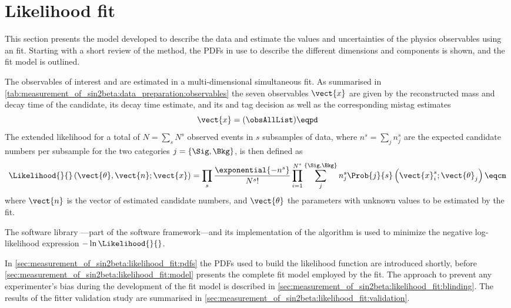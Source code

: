 
\section{Likelihood fit}
\label{sec:measurement_of_sin2beta:likelihood_fit}

This section presents the model developed to describe the data and estimate the
values and uncertainties of the physics observables using an \uEML fit. Starting
with a short review of the \uEML method, the \acp{PDF} in use to describe the
different dimensions and components is shown, and the fit model is outlined.

The \CP observables of interest \SJpsiKS and \CJpsiKS are estimated in a
multi-dimensional simultaneous \uEML fit. As summarised in
\cref{tab:measurement_of_sin2beta:data_preparation:observables} the seven
observables $\vect{x}$ are given by the reconstructed mass and decay time of the
\Bd candidate, its decay time estimate, and its \OS and \SSpi tag decision as
well as the corresponding mistag estimates
%
\begin{equation}\label{eq:measurement_of_sin2beta:likelihood_fit:observables}
  \vect{x} = (\obsAllList)\eqpd  
\end{equation}
%
The extended likelihood for a total of $N = \sum_s N^s$ observed events in $s$
subsamples of data, where $n^s = \sum_j n_j^s$ are the expected candidate
numbers per subsample for the two categories $j = \{\Sig,\Bkg\}$, is then
defined as
%
\begin{equation}\label{eq:measurement_of_sin2beta:likelihood_fit:uEML}
  \Likelihood{}{}\left(\vect{\theta},\vect{n};\vect{x}\right) = \prod_{s}^{}\frac{\exponential{-n^s}}{N^s!} \prod_{i=1}^{N^s} \sum_{j}^{\{\Sig,\Bkg\}} n_{j}^{s} \Prob{j}{s} \left( \vect{x}_{i}^{s} ; \vect{\theta}_j \right )\eqcm
\end{equation}
%
where $\vect{n}$ is the vector of estimated candidate numbers, and
$\vect{\theta}$ the parameters with unknown values to be estimated by the \uEML
fit.

The software library \RooFit \cite{Verkerke:2003ir}---part of the \ROOT
\cite{Antcheva:2011zz} software framework---and its implementation of the
\Minuit algorithm is used to minimize the negative log-likelihood expression
$-\ln\Likelihood{}{}$.

In \cref{sec:measurement_of_sin2beta:likelihood_fit:pdfs} the \acp{PDF} used to
build the likelihood function are introduced shortly, before
\cref{sec:measurement_of_sin2beta:likelihood_fit:model} presents the complete
fit model employed by the \uEML fit. The approach to prevent any experimenter's
bias during the development of the fit model is described in
\cref{sec:measurement_of_sin2beta:likelihood_fit:blinding}. The results of the
fitter validation study are summarised in
\cref{sec:measurement_of_sin2beta:likelihood_fit:validation}.

